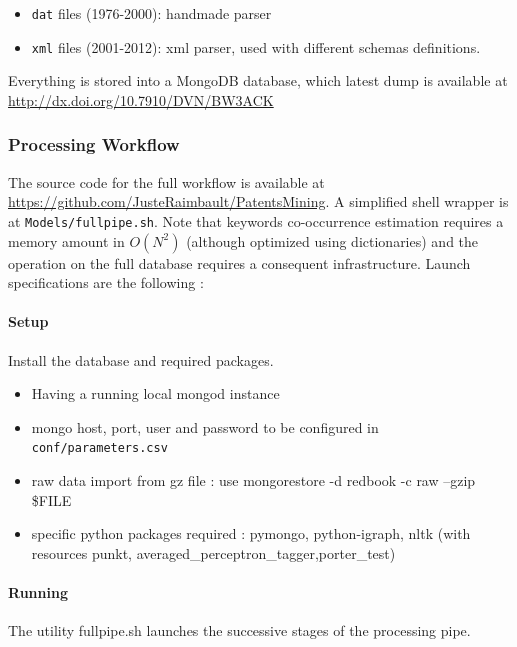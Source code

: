 \documentclass[12pt,twoside,a4paper]{article}
\begin{document}
\begin{itemize}
\item \texttt{dat} files (1976-2000): handmade parser
\item \texttt{xml} files (2001-2012): xml parser, used with different schemas definitions.
\end{itemize}

Everything is stored into a MongoDB database, which latest dump is available at %
\url{http://dx.doi.org/10.7910/DVN/BW3ACK} %

\subsubsection*{Processing Workflow}

The source code for the full workflow is available at \url{https://github.com/JusteRaimbault/PatentsMining}. A simplified shell wrapper is at \texttt{Models/fullpipe.sh}. Note that keywords co-occurrence estimation requires a memory amount in $O(N^2)$ (although optimized using dictionaries) and the operation on the full database requires a consequent infrastructure. Launch specifications are the following :

\paragraph{Setup} 

Install the database and required packages.

\begin{itemize}
\item Having a running local mongod instance
\item mongo host, port, user and password to be configured in \texttt{conf/parameters.csv}
\item raw data import from gz file : use mongorestore -d redbook -c raw --gzip {\$}FILE
\item specific python packages required : pymongo, python-igraph, nltk (with resources punkt, averaged{\_}perceptron{\_}tagger,porter{\_}test)
\end{itemize}

\paragraph{Running}

The utility fullpipe.sh launches the successive stages of the processing pipe.
\end{document}
